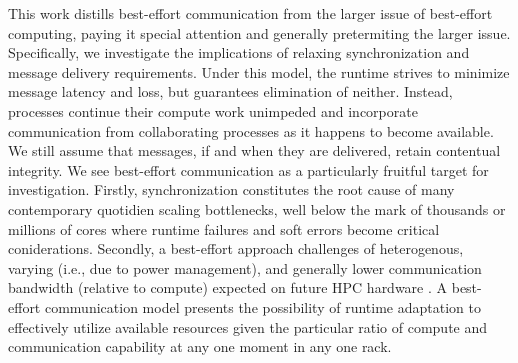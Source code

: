 This work distills best-effort communication from the larger issue of best-effort computing, paying it special attention and generally pretermiting the larger issue.
Specifically, we investigate the implications of relaxing synchronization and message delivery requirements.
Under this model, the runtime strives to minimize message latency and loss, but guarantees elimination of neither.
Instead, processes continue their compute work unimpeded and incorporate communication from collaborating processes as it happens to become available.
We still assume that messages, if and when they are delivered, retain contentual integrity.
We see best-effort communication as a particularly fruitful target for investigation.
Firstly, synchronization constitutes the root cause of many contemporary quotidien scaling bottlenecks, well below the mark of thousands or millions of cores where runtime failures and soft errors become critical coniderations.
Secondly, a best-effort approach  challenges of heterogenous, varying (i.e., due to power management), and generally lower communication bandwidth (relative to compute) expected on future HPC hardware \citep{gropp2013programming, acun2014parallel}.
A best-effort communication model presents the possibility of runtime adaptation to effectively utilize available resources given the particular ratio of compute and communication capability at any one moment in any one rack.


